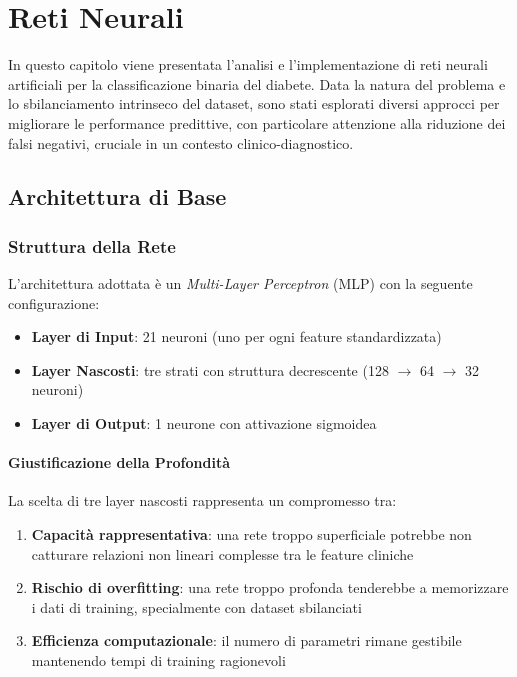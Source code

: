 \chapter{Reti Neurali}

In questo capitolo viene presentata l'analisi e l'implementazione di reti neurali artificiali per la classificazione binaria del diabete. Data la natura del problema e lo sbilanciamento intrinseco del dataset, sono stati esplorati diversi approcci per migliorare le performance predittive, con particolare attenzione alla riduzione dei falsi negativi, cruciale in un contesto clinico-diagnostico.

\section{Architettura di Base}

\subsection{Struttura della Rete}

L'architettura adottata è un \textit{Multi-Layer Perceptron} (MLP) con la seguente configurazione:

\begin{itemize}
    \item \textbf{Layer di Input}: 21 neuroni (uno per ogni feature standardizzata)
    \item \textbf{Layer Nascosti}: tre strati con struttura decrescente (128 $\rightarrow$ 64 $\rightarrow$ 32 neuroni)
    \item \textbf{Layer di Output}: 1 neurone con attivazione sigmoidea
\end{itemize}

\subsubsection{Giustificazione della Profondità}

La scelta di tre layer nascosti rappresenta un compromesso tra:
\begin{enumerate}
    \item \textbf{Capacità rappresentativa}: una rete troppo superficiale potrebbe non catturare relazioni non lineari complesse tra le feature cliniche
    \item \textbf{Rischio di overfitting}: una rete troppo profonda tenderebbe a memorizzare i dati di training, specialmente con dataset sbilanciati
    \item \textbf{Efficienza computazionale}: il numero di parametri rimane gestibile mantenendo tempi di training ragionevoli
\end{enumerate}

